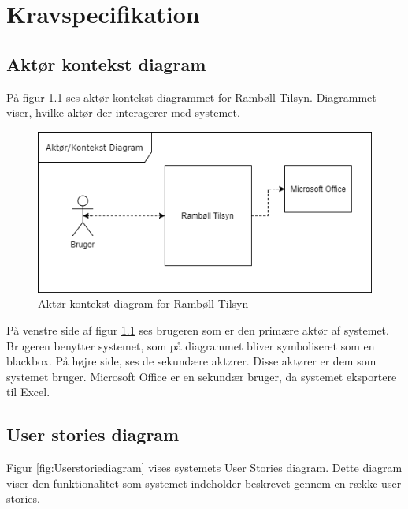 	\chapter{Kravspecifikation}
	
	\section{Aktør kontekst diagram}
		På figur \ref{fig:AktorKontekst} ses aktør kontekst diagrammet for Rambøll Tilsyn. Diagrammet viser, hvilke aktør der interagerer med systemet.
	\begin{figure}[H]
		\centering
		\includegraphics[width=0.6\linewidth]{Kravspecifikation/AktorDiagram}
		\caption{Aktør kontekst diagram for Rambøll Tilsyn}
		\label{fig:AktorKontekst}
	\end{figure}

	På venstre side af figur \ref{fig:AktorKontekst} ses brugeren som er den primære aktør af systemet. Brugeren benytter systemet, som på diagrammet bliver symboliseret som en blackbox. På højre side, ses de sekundære aktører. Disse aktører er dem som systemet bruger. Microsoft Office er en sekundær bruger, da systemet eksportere til Excel.
	
	\clearpage
	
\section{User stories diagram}
	Figur \ref{fig:Userstoriediagram} vises systemets User Stories diagram. Dette diagram viser den funktionalitet som systemet indeholder beskrevet gennem en række user stories.
	
